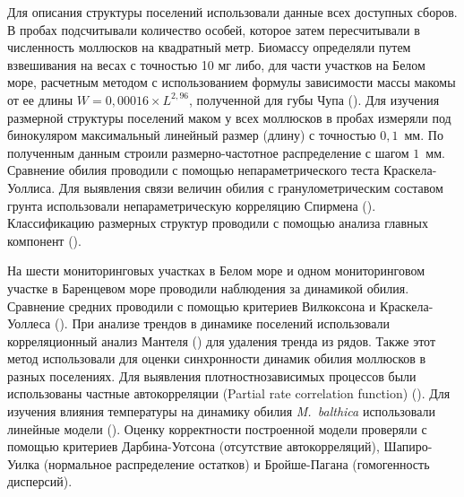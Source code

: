 Для описания структуры поселений использовали данные всех доступных сборов.
В пробах подсчитывали количество особей, которое затем пересчитывали в численность моллюсков на квадратный метр. 
Биомассу определяли путем взвешивания на весах с точностью 10 мг либо, для части участков на Белом море, расчетным методом с использованием формулы зависимости массы макомы от ее длины $W = 0,00016 \times L^{2,96}$, полученной для губы Чупа (\cite{Maximovich_et_al_1993}).
Для изучения размерной структуры поселений маком у всех моллюсков в пробах измеряли под бинокуляром максимальный линейный размер (длину) с точностью $0,1$~мм.
По полученным данным строили размерно-частотное распределение с шагом $1$~мм.
Сравнение обилия проводили с помощью непараметрического теста Краскела-Уоллиса. 
Для выявления связи величин обилия с гранулометрическим составом грунта использовали непараметрическую корреляцию Спирмена (\cite{Hollander_et_al_2013}).
Классификацию размерных структур проводили с помощью анализа главных компонент (\cite{Mardia_et_al_1979}).

На шести мониторинговых участках в Белом море и одном мониторинговом участке в Баренцевом море проводили наблюдения за динамикой обилия.
Сравнение средних проводили с помощью критериев Вилкоксона и Краскела-Уоллеса (\cite{Hollander_et_al_2013}).
При анализе трендов в динамике поселений использовали корреляционный анализ Мантеля (\cite{Legendre_Legendre_2012}) для удаления тренда из рядов. 
Также этот метод использовали для оценки синхронности динамик обилия моллюсков в разных поселениях.
Для выявления плотностнозависимых процессов были использованы частные автокорреляции (Partial rate correlation function) (\cite{Berryman_Turchin_2001}).
Для изучения влияния температуры на динамику обилия \textit{M.~balthica} использовали линейные модели (\cite{Chambers_Hastie_1991}).
Оценку корректности построенной модели проверяли с помощью критериев Дарбина-Уотсона (отсутствие автокорреляций), Шапиро-Уилка (нормальное распределение остатков) и Бройше-Пагана (гомогенность дисперсий).

